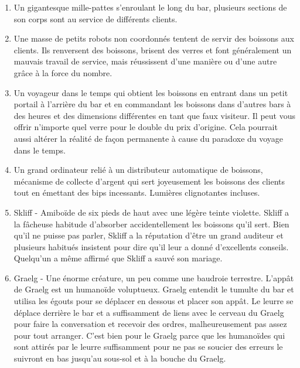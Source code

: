 \documentclass{article}
\begin{document}
\title{\vspace{-0.5cm}{\Huge 100 barman insolites de science-fiction} \vspace{-1cm}}

\date{}

\maketitle

\begin{enumerate}
	\item Un gigantesque mille-pattes s’enroulant le long du bar, plusieurs sections de son corps sont au service de différents clients.
	\item Une masse de petits robots non coordonnés tentent de servir des boissons aux clients. Ils renversent des boissons, brisent des verres et font généralement un mauvais travail de service, mais réussissent d'une manière ou d'une autre grâce à la force du nombre.
	\item Un voyageur dans le temps qui obtient les boissons en entrant dans un petit portail à l'arrière du bar et en commandant les boissons dans d'autres bars à des heures et des dimensions différentes en tant que faux visiteur. Il peut vous offrir n'importe quel verre pour le double du prix d'origine. Cela pourrait aussi altérer la réalité de façon permanente à cause du paradoxe du voyage dans le temps.
	\item Un grand ordinateur relié à un distributeur automatique de boissons, mécanisme de collecte d'argent qui sert joyeusement les boissons des clients tout en émettant des bips incessants. Lumières clignotantes incluses.
	\item Skliff - Amiboïde de six pieds de haut avec une légère teinte violette. Skliff a la fâcheuse habitude d'absorber accidentellement les boissons qu'il sert. Bien qu'il ne puisse pas parler, Skliff a la réputation d'être un grand auditeur et plusieurs habitués insistent pour dire qu'il leur a donné d'excellents conseils. Quelqu’un a même affirmé que Skliff a sauvé son mariage.
	\item Graelg - Une énorme créature, un peu comme une baudroie terrestre. L’appât de Graelg est un humanoïde voluptueux. Graelg entendit le tumulte du bar et utilisa les égouts pour se déplacer en dessous et placer son appât. Le leurre se déplace derrière le bar et a suffisamment de liens avec le cerveau du Graelg pour faire la conversation et recevoir des ordres, malheureusement pas assez pour tout arranger. C'est bien pour le Graelg parce que les humanoïdes qui sont attirés par le leurre suffisamment pour ne pas se soucier des erreurs le suivront en bas jusqu'au sous-sol et à la bouche du Graelg.

\end{enumerate}
\end{document}
